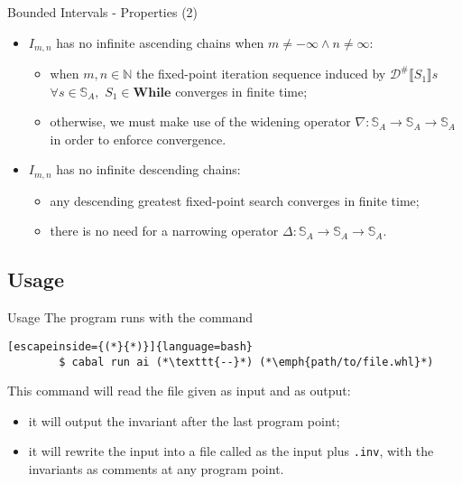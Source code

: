 \begin{frame}{Bounded Intervals - Properties (2)}
    \begin{itemize}
        \item $I_{m,n}$ has no infinite ascending chains when $m \neq -\infty \land n \neq \infty$:
        \begin{itemize}
            \item when $m,n\in \mathbb{N}$ the fixed-point iteration sequence induced by $\mathcal{D}^{\#}\llbracket S_1 \rrbracket s$ $\forall s \in \mathbb{S}_A,\,\,S_1 \in \textbf{While}$ converges in finite time;
            \item otherwise, we must make use of the widening operator $\nabla: \mathbb{S}_A \to \mathbb{S}_A \to\mathbb{S}_A$ in order to enforce convergence. 
        \end{itemize}
        \item $I_{m,n}$ has no infinite descending chains:
        \begin{itemize}
            \item any descending greatest fixed-point search converges in finite time;
            \item there is no need for a narrowing operator $\Delta: \mathbb{S}_A \to \mathbb{S}_A \to\mathbb{S}_A$.
        \end{itemize}
    \end{itemize}
    
\end{frame}

\subsection{Usage}

\begin{frame}[fragile]{Usage}
    The program runs with the command
    \begin{lstlisting}[escapeinside={(*}{*)}]{language=bash}
        $ cabal run ai (*\texttt{--}*) (*\emph{path/to/file.whl}*)
    \end{lstlisting}
    This command will read the file given as input and as output:
    \begin{itemize}
        \item it will output the invariant after the last program point;
        \item it will rewrite the input into a file called as the input plus \texttt{.inv}, with the invariants as comments at any program point.
    \end{itemize}
    
\end{frame}

